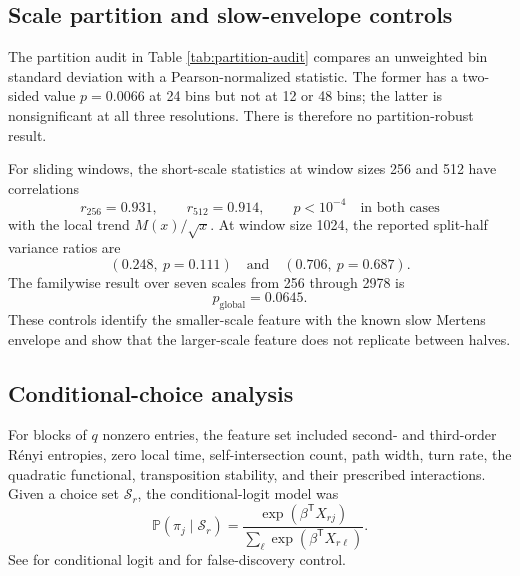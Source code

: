 \documentclass[11pt,reqno]{amsart}
\numberwithin{equation}{section}
\theoremstyle{plain}
\theoremstyle{definition}
\theoremstyle{remark}
\newcommand{\Prob}{\mathbb P}
\begin{document}
\subsection{Scale partition and slow-envelope controls}
\label{subsec:scale-controls}

The partition audit in Table \ref{tab:partition-audit} compares an unweighted
bin standard deviation with a Pearson-normalized statistic.  The former has a
two-sided value \(p=0.0066\) at 24 bins but not at 12 or 48 bins; the latter
is nonsignificant at all three resolutions.  There is therefore no
partition-robust result.

For sliding windows, the short-scale statistics at window sizes 256 and 512
have correlations
\begin{equation}
r_{256}=0.931,\qquad r_{512}=0.914,\qquad p<10^{-4}
\quad\text{in both cases}
\label{eq:slow-envelope-correlations}
\end{equation}
with the local trend \(M(x)/\sqrt x\).  At window size 1024, the reported
split-half variance ratios are
\begin{equation}
(0.248,\ p=0.111)\quad\text{and}\quad
(0.706,\ p=0.687).
\label{eq:split-half-results}
\end{equation}
The familywise result over seven scales from 256 through 2978 is
\begin{equation}
p_{\mathrm{global}}=0.0645.
\label{eq:scale-family-result}
\end{equation}
These controls identify the smaller-scale feature with the known slow
Mertens envelope and show that the larger-scale feature does not replicate
between halves.

\subsection{Conditional-choice analysis}
\label{subsec:conditional-choice-analysis}

For blocks of \(q\) nonzero entries, the feature set included second- and
third-order R\'enyi entropies, zero local time, self-intersection count, path
width, turn rate, the quadratic functional, transposition stability, and
their prescribed interactions.  Given a choice set \(\mathcal S_r\), the
conditional-logit model was
\begin{equation}
\Prob(\pi_j\mid\mathcal S_r)
=\frac{\exp(\beta^{\mathsf T}X_{rj})}
{\sum_{\ell}\exp(\beta^{\mathsf T}X_{r\ell})}.
\label{eq:conditional-logit-model}
\end{equation}
See \cite{McFadden1974} for conditional logit and
\cite{BenjaminiHochberg1995} for false-discovery control.
\end{document}
